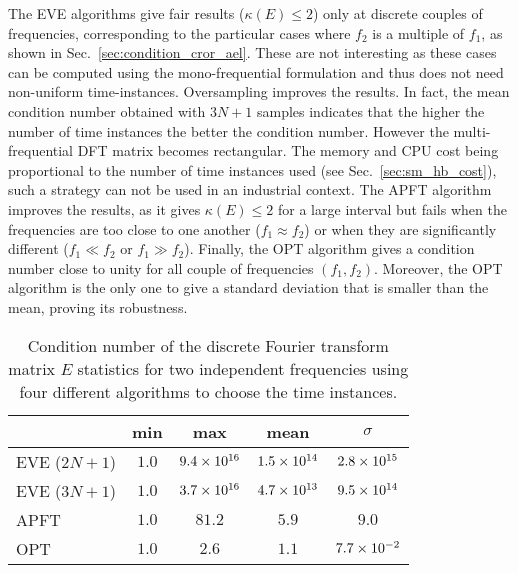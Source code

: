 The EVE algorithms give fair results ($\kappa(E) \leq 2$) only at
discrete couples of frequencies, corresponding to the particular cases where $f_2$ is a
multiple of $f_1$, as shown in Sec.~\ref{sec:condition_cror_ael}. These are not interesting as these
cases can be computed using the mono-frequential formulation and thus does not
need non-uniform time-instances. Oversampling improves the results. 
In fact, the mean condition number obtained
with $3N + 1$ samples indicates that the higher the number of time instances
the better the condition number. However the multi-frequential DFT
matrix becomes rectangular. The memory and CPU cost being proportional to 
the number of time instances used (see Sec.~\ref{sec:sm_hb_cost}), 
such a strategy can not be
used in an industrial context. The APFT
algorithm improves the results, as it gives $\kappa (E) \leq 2$ 
for a large interval but fails when the frequencies
are too close to one another ($f_1 \approx f_2$) or when they are significantly
different ($f_1 \ll f_2$ or $f_1 \gg f_2$).  
Finally, the OPT algorithm gives a condition number close to unity for
all couple of frequencies $(f_1, f_2)$. Moreover, the OPT algorithm is
the only one to give a standard deviation that is smaller than the mean,
proving its robustness.
\begin{table}[htp]
  \centering
  \begin{tabular}{lcccc}
    \toprule
    \phantom{abdefghijk} & min & max & mean & $\sigma$ \\
    \midrule
    EVE ($2N + 1$) & $1.0$ & $9.4\times 10^{16}$ & $1.5\times 10^{14}$ & $2.8\times 10^{15}$ \\
    EVE ($3N + 1$) & $1.0$ & $3.7\times 10^{16}$ & $4.7\times 10^{13}$ & $9.5\times 10^{14}$ \\
    APFT & $1.0$ & $81.2$ & $5.9$ & $9.0$ \\
    OPT & $1.0$ & $2.6$ & $1.1$ & $7.7\times 10^{-2}$ \\
    \bottomrule
  \end{tabular}
  \caption{Condition number of the discrete Fourier transform matrix $E$
  statistics for two independent frequencies using four different algorithms
  to choose the time instances.}
  \label{tab:algo_sum}
\end{table} 


